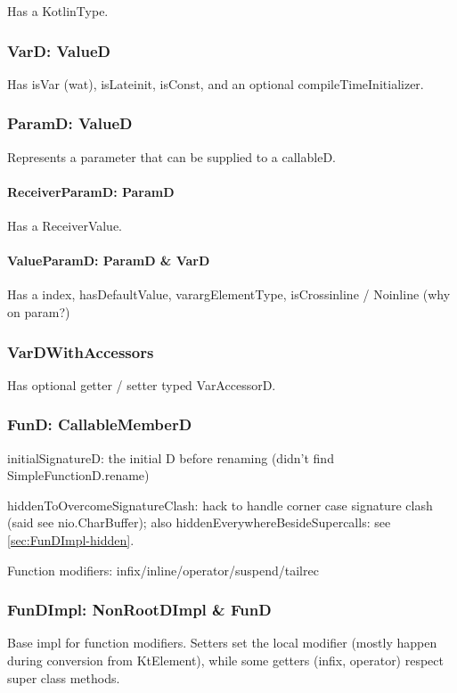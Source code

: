 \documentclass{article}
\begin{document}
Has a KotlinType.

\subsubsection{VarD: ValueD}

Has isVar (wat), isLateinit, isConst, and an optional compileTimeInitializer.

\subsubsection{ParamD: ValueD}
Represents a parameter that can be supplied to a callableD.

\paragraph{ReceiverParamD: ParamD}
Has a ReceiverValue.

\paragraph{ValueParamD: ParamD \& VarD}
\label{sec:ValueParamD}
Has a index, hasDefaultValue, varargElementType, isCrossinline / Noinline (why on param?)

\subsubsection{VarDWithAccessors}

Has optional getter / setter typed VarAccessorD.

\subsubsection{FunD: CallableMemberD}

initialSignatureD: the initial D before renaming (didn't find SimpleFunctionD.rename)

hiddenToOvercomeSignatureClash: hack to handle corner case signature clash (said see nio.CharBuffer); also hiddenEverywhereBesideSupercalls: see \ref{sec:FunDImpl-hidden}.

Function modifiers: infix/inline/operator/suspend/tailrec

\subsubsection{FunDImpl: NonRootDImpl \& FunD}

Base impl for function modifiers. Setters set the local modifier (mostly happen during conversion from KtElement), while some getters (infix, operator) respect super class methods.
\end{document}
